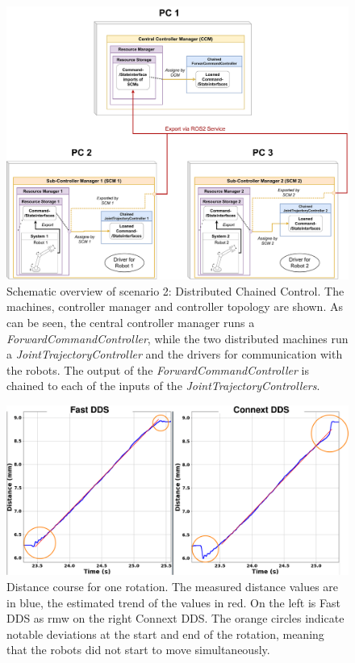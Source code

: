 \begin{figure}[htbp]
	\centering
	\includegraphics[width=1\textwidth]{Figures/c6/test_scenario_2.pdf}
	\caption{Schematic overview of scenario 2: Distributed Chained Control. The machines, controller manager and controller topology are shown. As can be seen, the central controller manager runs a \textit{ForwardCommandController}, while the two distributed machines run a \textit{JointTrajectoryController} and the drivers for communication with the robots. The output of the \textit{ForwardCommandController} is chained to each of the inputs of the \textit{JointTrajectoryControllers}.}
	\label{c6_fig_test_scenario_2}
\end{figure}

\begin{figure}[htbp]
	\centering
	\includegraphics[width=1\textwidth]{Figures/c6/s2/s2_fast_vs_connext.png}
	\caption{Distance course for one rotation. The measured distance values are in blue, the estimated trend of the values in red. On the left is Fast DDS as \gls{rmw} on the right Connext DDS. The orange circles indicate notable deviations at the start and end of the rotation, meaning that the robots did not start to move simultaneously.}
	\label{c6_fig_s2_fast_vs_connext}
\end{figure}
